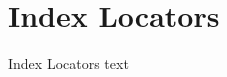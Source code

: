 

\section{Index Locators}\fbeg{}\begin{frame}{}

{\fontsize{20}{23}\selectfont

Index Locators text

}

\end{frame}


